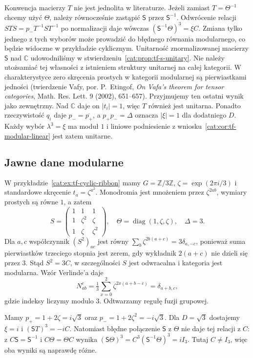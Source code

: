 Konwencja macierzy $T$ nie jest jednolita w literaturze. Jeżeli zamiast $T=\Theta^{-1}$ chcemy użyć $\Theta$, należy równocześnie zastąpić $\mathsf S$ przez $\mathsf S^{-1}$. Odwrócenie relacji $STS=p_-T^{-1}ST^{-1}$ po normalizacji daje wówczas $(\mathsf S^{-1}\Theta)^3=\xi C$. Zmiana tylko jednego z tych wyborów może prowadzić do błędnego równania modularnego, co będzie widoczne w przykładzie cyklicznym. Unitarność znormalizowanej macierzy $\mathsf S$ nad $\mathbb C$ udowodniliśmy w stwierdzeniu~\ref{cat:prop:tf-s-unitary}. Nie należy utożsamiać tej własności z istnieniem struktury unitarnej na całej kategorii. W charakterystyce zero skręcenia prostych w kategorii modularnej są pierwiastkami jedności (twierdzenie Vafy, por. P.~Etingof, \emph{On Vafa's theorem for tensor categories}, Math. Res. Lett. 9 (2002), 651--657). Przyjmujemy ten ostatni wynik jako zewnętrzny. Nad $\mathbb C$ daje on $|t_i|=1$, więc $T$ również jest unitarna. Ponadto rzeczywistość $q_i$ daje $p_-=\overline{p_+}$, a $p_+p_-=\Delta$ oznacza $|\xi|=1$ dla dodatniego $D$. Każdy wybór $\lambda^3=\xi$ ma moduł $1$ i liniowe podniesienie z wniosku~\ref{cat:cor:tf-modular-linear} jest zatem unitarne.

\subsection{Jawne dane modularne}

\begin{przyklad}\label{cat:ex:tf-modular-cyclic}
W przykładzie~\ref{cat:ex:tf-cyclic-ribbon} mamy $G=\mathbb Z/3\mathbb Z$, $\zeta=\exp(2\pi i/3)$ i standardowe skręcenie $t_a=\zeta^{a^2}$. Monodromia jest mnożeniem przez $\zeta^{2ab}$, wymiary prostych są równe $1$, a zatem
\[
 S=\begin{pmatrix}
 1&1&1\\1&\zeta^2&\zeta\\1&\zeta&\zeta^2
 \end{pmatrix},
 \quad \Theta=\operatorname{diag}(1,\zeta,\zeta),
 \quad \Delta=3.
\]
Dla $a,c$ współczynnik $(S^2)_{ac}$ jest równy $\sum_b\zeta^{2b(a+c)}=3\delta_{a,-c}$, ponieważ suma pierwiastków trzeciego stopnia jest zerem, gdy wykładnik $2(a+c)$ nie dzieli się przez $3$. Stąd $S^2=3C$, w szczególności $S$ jest odwracalna i kategoria jest modularna. Wzór Verlinde'a daje
\[
 N_{ab}^{c}=\tfrac13\sum_{x=0}^2\zeta^{2x(a+b-c)}
 =\delta_{a+b,c},
\]
gdzie indeksy liczymy modulo $3$. Odtwarzamy regułę fuzji grupowej.

Mamy $p_+=1+2\zeta=i\sqrt3$ oraz $p_-=1+2\zeta^2=-i\sqrt3$. Dla $D=\sqrt3$ dostajemy $\xi=i$ i $(\mathsf ST)^3=-iC$. Natomiast błędne połączenie $\mathsf S$ z $\Theta$ nie daje tej relacji z $C$: z $C\mathsf S=\mathsf S^{-1}$ i $C\Theta=\Theta C$ wynika
$(\mathsf S\Theta)^3=C^3(\mathsf S^{-1}\Theta)^3=iI_3$.
Tutaj $C\neq I_3$, więc oba wyniki są naprawdę różne.
\end{przyklad}

